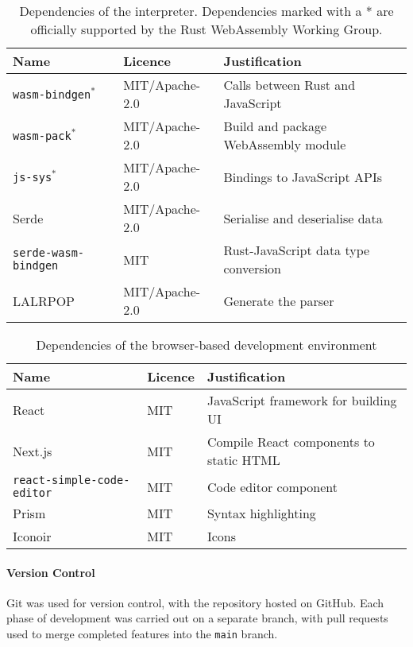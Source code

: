 \begin{table}[H]
\centering
\begin{tabular}{lll}
\hline
\textbf{Name} & \textbf{Licence} & \textbf{Justification} \\
\hline
\texttt{wasm-bindgen}$^*$ & MIT/Apache-2.0 & Calls between Rust and JavaScript \\
\texttt{wasm-pack}$^*$ & MIT/Apache-2.0 & Build and package WebAssembly module \\
\texttt{js-sys}$^*$ & MIT/Apache-2.0 & Bindings to JavaScript APIs \\
Serde & MIT/Apache-2.0 & Serialise and deserialise data \\
\texttt{serde-wasm-bindgen} & MIT & Rust-JavaScript data type conversion \\
LALRPOP & MIT/Apache-2.0 & Generate the parser \\
\hline
\end{tabular}
\caption{Dependencies of the interpreter. Dependencies marked with a * are officially supported by the Rust WebAssembly Working Group.}
\label{tab:core-dependencies}
\end{table}

\begin{table}[H]
\centering
\begin{tabular}{lll}
\hline
\textbf{Name} & \textbf{Licence} & \textbf{Justification} \\
\hline
React & MIT & JavaScript framework for building UI \\
Next.js & MIT & Compile React components to static HTML \\
\texttt{react-simple-code-editor} & MIT & Code editor component \\
Prism & MIT & Syntax highlighting \\
Iconoir & MIT & Icons \\
\hline
\end{tabular}
\caption{Dependencies of the browser-based development environment}
\label{tab:web-dependencies}
\end{table}

\paragraph{Version Control}

Git was used for version control, with the repository hosted on GitHub. Each phase of development was carried out on a separate branch, with pull requests used to merge completed features into the \texttt{main} branch.


